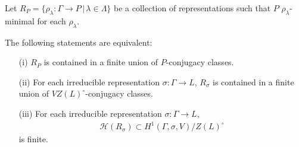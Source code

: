 \begin{lemma}
  Let $R_P = \{\rho_\lambda:\Gamma\rightarrow P\,|\,\lambda\in\Lambda\}$ be a collection of representations such that $P$ $\rho_\lambda$-minimal for each $\rho_\lambda$.
  
  The following statements are equivalent:
  \begin{itemize}
    \item[(i)] $R_P$ is contained in a finite union of $P$-conjugacy classes.
    \item[(ii)] For each irreducible representation $\sigma:\Gamma\rightarrow L$, $R_{\sigma}$ is contained in a finite union of $VZ(L)^\circ$-conjugacy classes.
    \item[(iii)] For each irreducible representation $\sigma:\Gamma\rightarrow L$,
      \begin{eqnarray*}
	\mathcal{H}(R_{\sigma}) \subset H^{1}(\Gamma,\sigma,V)/Z(L)^\circ
      \end{eqnarray*}
      is finite.
  \end{itemize}
  \label{lem:p_h1}
\end{lemma}
